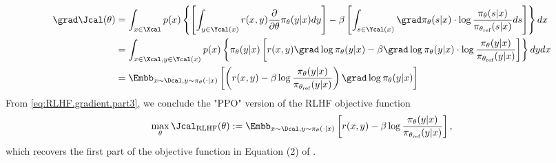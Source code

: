 \begin{align}\label{eq:RLHF.gradient.part3}
\grad \Jcal(\theta)
 & = \int_{x\in \Xcal} p(x)\left\{\left[\int_{y\in\Ycal(x)}r(x,y)\frac{\partial}{\partial \theta}\pi_{\theta}(y|x)dy\right] - \beta \left[\int_{s\in\Ycal(x)}\grad\pi_{\theta}(s|x)\cdot\log\frac{\pi_{\theta}(s|x)}{\pi_{\theta_{\text{ref}}}(s|x)} ds\right] \right\}dx \nonumber\\
 & = \int_{x\in \Xcal, y\in\Ycal(x)} p(x)\left\{ \pi_{\theta}(y|x) \left[ r(x,y)\grad\log \pi_{\theta}(y|x) - \beta\grad\log\pi_{\theta}(y|x)\cdot\log\frac{\pi_{\theta}(y|x)}{\pi_{\theta_{\text{ref}}}(y|x)}\right]  \right\}dydx \nonumber\\
 & = \Embb_{x\sim \Dcal, y\sim\pi_{\theta}(\cdot|x)}\left[\left(r(x,y) - \beta\log\frac{\pi_{\theta}(y|x)}{\pi_{\theta_{\text{ref}}}(y|x)}\right)\grad\log\pi_{\theta}(y|x)\right]
\end{align}
From \eqref{eq:RLHF.gradient.part3}, we conclude the "PPO" version of the RLHF objective function
\begin{align}\label{eq:rlhf.obj}
  \max_{\theta} \Jcal_{\text{RLHF}}(\theta):=\Embb_{x\sim \Dcal, y\sim\pi_{\theta}(\cdot|x)}\left[r(x,y) - \beta\log\frac{\pi_{\theta}(y|x)}{\pi_{\theta_{\text{ref}}}(y|x)}\right],
\end{align}
which recovers the first part of the objective function in Equation (2) of \citet{ouyang2022training}.